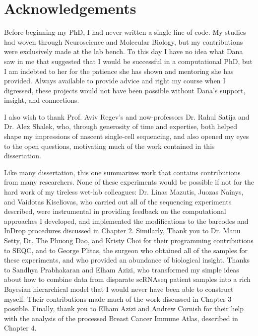 
\cleartorecto %
\chapter{Acknowledgements} %
\thispagestyle{plain} %

Before beginning my PhD, I had never written a single line of code. 
My studies had woven through Neuroscience and Molecular Biology, but my contributions were exclusively made at the lab bench.  
To this day I have no idea what Dana saw in me that suggested that I would be successful in a computational PhD, but I am indebted to her for the patience she has shown and mentoring she has provided. 
Always available to provide advice and right my course when I digressed, these projects would not have been possible without Dana's support, insight, and connections.

I also wish to thank Prof. Aviv Regev's and now-professors Dr. Rahul Satija and Dr. Alex Shalek, who, through generosity of time and expertise, both helped shape my impressions of nascent single-cell sequencing, and also opened my eyes to the open questions, motivating much of the work contained in this dissertation. 

Like many dissertation, this one summarizes work that contains contributions from many researchers. 
None of these experiments would be possible if not for the hard work of my tireless wet-lab colleagues: Dr. Linas Mazutis, Juozas Nainys, and Vaidotas Kiseliovas, who carried out all of the sequencing experiments described, were instrumental in providing feedback on the computational approaches I developed, and implemented the modifications to the barcodes and InDrop procedures discussed in Chapter 2. 
Similarly, Thank you to Dr. Manu Setty, Dr. The Phuong Dao, and Kristy Choi for their programming contributions to SEQC, and to George Plitas, the surgeon who obtained all of the samples for these experiments, and who provided an abundance of biological insight. 
Thanks to Sandhya Prabhakaran and Elham Azizi, who transformed my simple ideas about how to combine data from disparate scRNAseq patient samples into a rich Bayesian hierarchical model that I would never have been able to construct myself. Their contributions made much of the work discussed in Chapter 3 possible.  
Finally, thank you to Elham Azizi and Andrew Cornish for their help with the analysis of the processed Breast Cancer Immune Atlas, described in Chapter 4.  

